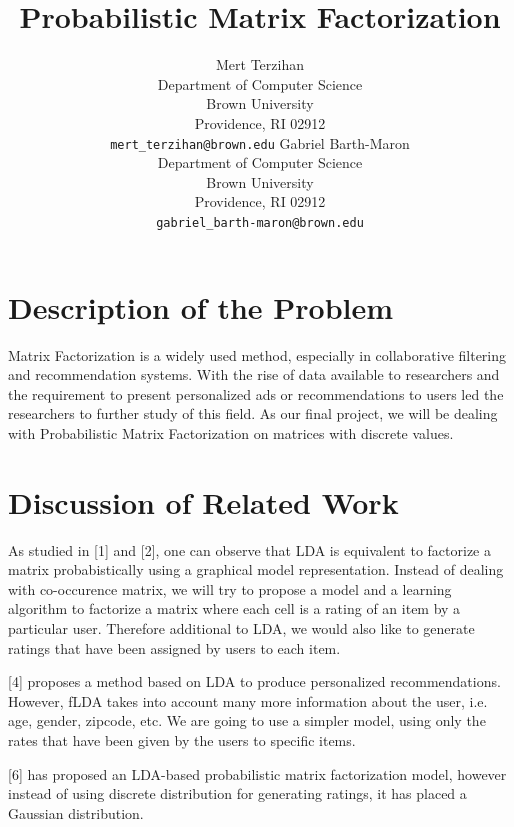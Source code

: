 \documentclass{article} %
\title{Probabilistic Matrix Factorization}
\author{ 
  Mert Terzihan \\
  Department of Computer Science\\
  Brown University\\
  Providence, RI 02912 \\
  \texttt{mert\_terzihan@brown.edu}
  \And
  Gabriel Barth-Maron \\
  Department of Computer Science \\
  Brown University \\
  Providence, RI 02912 \\
  \texttt{gabriel\_barth-maron@brown.edu}\\
}
\begin{document}
\maketitle

\section{Description of the Problem}
\label{desc}
Matrix Factorization is a widely used method, especially in collaborative 
filtering and recommendation systems. With the rise of data available to 
researchers and the requirement to present personalized ads or recommendations 
to users led the researchers to further study of this field. As our final 
project, we will be dealing with Probabilistic Matrix Factorization on 
matrices with discrete values. 


\section{Discussion of Related Work}
\label{work}
As studied in [1] and [2], one can observe that LDA is equivalent to factorize a matrix 
probabistically using a graphical model representation. Instead of dealing with 
co-occurence matrix, we will try to propose a model and a learning algorithm to 
factorize a matrix where each cell is a rating of an item by a particular user. 
Therefore additional to LDA, we would also like to generate ratings that have been 
assigned by users to each item. 

[4] proposes a method based on LDA to produce personalized recommendations. 
However, fLDA takes into account many more information about the user, i.e. age, 
gender, zipcode, etc. We are going to use a simpler model, using only the rates 
that have been given by the users to specific items. 

[6] has proposed an LDA-based probabilistic matrix factorization model, however 
instead of using discrete distribution for generating ratings, it has placed a 
Gaussian distribution. 
\end{document}
